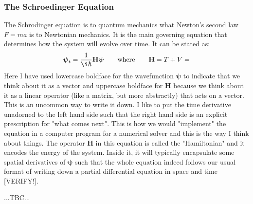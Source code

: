 
\subsubsection{The Schroedinger Equation}
The  Schrodinger equation is to quantum mechanics what Newton's second law $F = m a$ is to Newtonian mechanics. It is the main governing equation that determines how the system will evolve over time. It can be stated as:
\begin{equation}
 \boldsymbol{\psi}_{t} = \frac{1}{\i \hbar} \mathbf{H} \boldsymbol{\psi}
 \qquad \text{where} \qquad
 \mathbf{H} = T + V = 
\end{equation}
Here I have used lowercase boldface for the wavefunction $\boldsymbol{\psi}$ to indicate that we think about it as a vector and uppercase boldface for $\mathbf{H}$ because we think about it as a linear operator (like a matrix, but more abstractly) that acts on a vector. This is an uncommon way to write it down. I like to put the time derivative unadorned to the left hand side such that the right hand side is an explicit prescription for "what comes next". This is how we would "implement" the equation in a computer program for a numerical solver and this is the way I think about things. The operator $\mathbf{H}$ in this equation is called the "Hamiltonian" and it encodes the energy of the system. Inside it, it will typically encapsulate some spatial derivatives of $\boldsymbol{\psi}$ such that the whole equation indeed follows our usual format of writing down a partial differential equation in space and time [VERIFY!].

...TBC...





